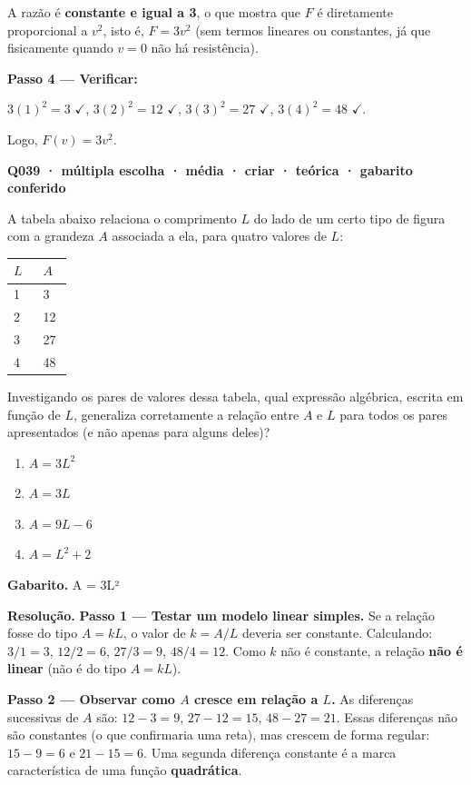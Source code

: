 \documentclass[11pt,a4paper]{article}
\begin{document}
A razão é \textbf{constante e igual a 3}, o que mostra que $F$ é diretamente proporcional a $v^2$, isto é, $F = 3v^2$ (sem termos lineares ou constantes, já que fisicamente quando $v=0$ não há resistência).

\textbf{Passo 4 — Verificar:}

$3(1)^2=3$ $\checkmark$, $3(2)^2=12$ $\checkmark$, $3(3)^2=27$ $\checkmark$, $3(4)^2=48$ $\checkmark$.

Logo, $F(v) = 3v^2$.

\bigskip\noindent\textbf{Q039 · múltipla escolha · média · criar · teórica · gabarito conferido}\par\nopagebreak
A tabela abaixo relaciona o comprimento $L$ do lado de um certo tipo de figura com a grandeza $A$ associada a ela, para quatro valores de $L$:

\begin{center}
\begin{tabular}{|p{0.430\linewidth}|p{0.430\linewidth}|}
\hline
\textbf{$L$} & \textbf{$A$} \\
\hline
1 & 3 \\
\hline
2 & 12 \\
\hline
3 & 27 \\
\hline
4 & 48 \\
\hline
\end{tabular}
\end{center}

Investigando os pares de valores dessa tabela, qual expressão algébrica, escrita em função de $L$, generaliza corretamente a relação entre $A$ e $L$ para todos os pares apresentados (e não apenas para alguns deles)?
\begin{enumerate}[label=(\alph*)]
\item $A = 3L^2$
\item $A = 3L$
\item $A = 9L - 6$
\item $A = L^2 + 2$
\end{enumerate}

\textbf{Gabarito.} A = 3L²

\textbf{Resolução.} \textbf{Passo 1 — Testar um modelo linear simples.}
Se a relação fosse do tipo $A = kL$, o valor de $k = A/L$ deveria ser constante. Calculando: $3/1=3$, $12/2=6$, $27/3=9$, $48/4=12$. Como $k$ não é constante, a relação \textbf{não é linear} (não é do tipo $A=kL$).

\textbf{Passo 2 — Observar como $A$ cresce em relação a $L$.}
As diferenças sucessivas de $A$ são: $12-3=9$, $27-12=15$, $48-27=21$. Essas diferenças não são constantes (o que confirmaria uma reta), mas crescem de forma regular: $15-9=6$ e $21-15=6$. Uma segunda diferença constante é a marca característica de uma função \textbf{quadrática}.
\end{document}
